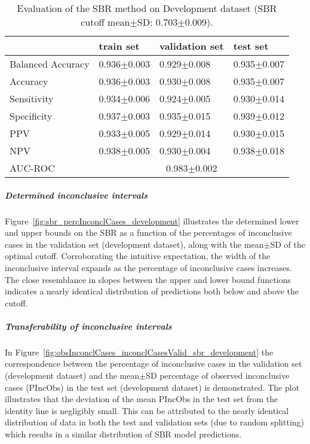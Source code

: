 \begin{table}[ht]
  \caption{Evaluation of the SBR method on Development dataset (SBR cutoff mean$\pm$SD: 0.703$\pm$0.009).}
  \centering
  \begin{tabular}{llll}
      \hline
                        & train set         & validation set      & test set             \\
      \hline
      Balanced Accuracy & 0.936$\pm$0.003   &   0.929$\pm$0.008   &  0.935$\pm$0.007     \\
      Accuracy          & 0.936$\pm$0.003   &   0.930$\pm$0.008   &  0.935$\pm$0.007     \\
      Sensitivity       &  0.934$\pm$0.006  &   0.924$\pm$0.005   &  0.930$\pm$0.014     \\
      Specificity       & 0.937$\pm$0.003   &   0.935$\pm$0.015   &  0.939$\pm$0.012     \\
      PPV               &  0.933$\pm$0.005  &   0.929$\pm$0.014   &  0.930$\pm$0.015     \\
      NPV               &  0.938$\pm$0.005  &   0.930$\pm$0.004   &  0.938$\pm$0.018     \\
      \hline
      AUC-ROC          &  \multicolumn{3}{c}{0.983$\pm$0.002 }  \\
      \hline
  \end{tabular}
 \label{t1:sbr_perf_eval_table}
\end{table}

\subparagraph{Determined inconclusive intervals}

Figure~\ref{fig:sbr_percInconclCases_development} illustrates the determined lower and upper bounds on the SBR 
as a function of the percentages of inconclusive cases in the validation set (development dataset), 
along with the mean$\pm$SD of the optimal cutoff.
Corroborating the intuitive expectation, the width of the inconclusive interval expands 
as the percentage of inconclusive cases increases.
The close resemblance in slopes between the upper and lower bound functions 
indicates a nearly identical distribution of predictions both below and above the cutoff.

\subparagraph{Transferability of inconclusive intervals}

In Figure~\ref{fig:obsInconclCases_inconclCasesValid_sbr_development} the correspondence between 
the percentage of inconclusive cases in the validation set (development dataset) and 
the mean$\pm$SD percentage of observed inconclusive cases (PIncObs) in the test set (development dataset) is demonstrated.
The plot illustrates that the deviation of the mean PIncObs in the test set from the 
identity line is negligibly small.
This can be attributed to the nearly identical distribution of data in both the test and validation sets 
(due to random splitting) which results in a similar distribution of SBR model predictions.


